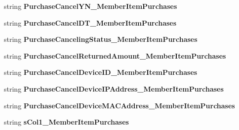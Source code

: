 \begin{DoxyCompactItemize}
\item 
string {\bfseries Purchase\+Cancel\+Y\+N\+\_\+\+Member\+Item\+Purchases}\hypertarget{a00118_af906f86d0c5448e028517e094280409b}{}\label{a00118_af906f86d0c5448e028517e094280409b}

\item 
string {\bfseries Purchase\+Cancel\+D\+T\+\_\+\+Member\+Item\+Purchases}\hypertarget{a00118_aa766bbd82544663193597f339303c14a}{}\label{a00118_aa766bbd82544663193597f339303c14a}

\item 
string {\bfseries Purchase\+Canceling\+Status\+\_\+\+Member\+Item\+Purchases}\hypertarget{a00118_ac6f5bbc7614e2cac93cfaf3c3a8837d2}{}\label{a00118_ac6f5bbc7614e2cac93cfaf3c3a8837d2}

\item 
string {\bfseries Purchase\+Cancel\+Returned\+Amount\+\_\+\+Member\+Item\+Purchases}\hypertarget{a00118_a49a7dd2390638e32a3890eaee8bbb861}{}\label{a00118_a49a7dd2390638e32a3890eaee8bbb861}

\item 
string {\bfseries Purchase\+Cancel\+Device\+I\+D\+\_\+\+Member\+Item\+Purchases}\hypertarget{a00118_ac96648a37c5410d93b28334cf07e9085}{}\label{a00118_ac96648a37c5410d93b28334cf07e9085}

\item 
string {\bfseries Purchase\+Cancel\+Device\+I\+P\+Address\+\_\+\+Member\+Item\+Purchases}\hypertarget{a00118_a35cd471b429fcf79b8fa2fa84b5fd655}{}\label{a00118_a35cd471b429fcf79b8fa2fa84b5fd655}

\item 
string {\bfseries Purchase\+Cancel\+Device\+M\+A\+C\+Address\+\_\+\+Member\+Item\+Purchases}\hypertarget{a00118_a037de2e4447171d222757d61cff6f91e}{}\label{a00118_a037de2e4447171d222757d61cff6f91e}

\item 
string {\bfseries s\+Col1\+\_\+\+Member\+Item\+Purchases}\hypertarget{a00118_af417686dbc45444d30ab63f39531ba7f}{}\label{a00118_af417686dbc45444d30ab63f39531ba7f}


\end{DoxyCompactItemize}

